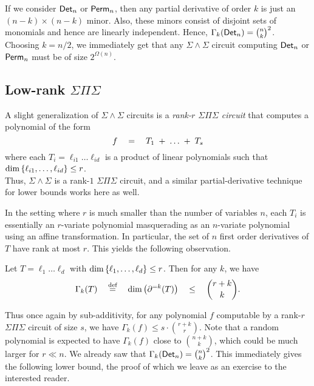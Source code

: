 \documentclass[12pt]{report}
\begin{document}
If we consider $\mathsf{Det}_n$ or $\mathsf{Perm}_n$, then any partial derivative of order $k$ is just an $(n-k)\times(n-k)$ minor. Also, these minors consist of disjoint sets of monomials and hence are linearly independent. Hence, $\Gamma_k(\mathsf{Det}_n) = \binom{n}{k}^2$. Choosing $k = n/2$, we immediately get that any $\Sigma\!\wedge\!\Sigma$ circuit computing $\mathsf{Det}_n$ or $\mathsf{Perm}_n$ must be of size $2^{\Omega(n)}$. \\

\subsection{Low-rank $\Sigma\Pi\Sigma$}\label{sec:low-rank-sps}

A slight generalization of $\Sigma\!\wedge\!\Sigma$ circuits is a \emph{rank-$r$ $\Sigma\Pi\Sigma$ circuit} that computes a polynomial of the form 
$$
f \quad = \quad  T_1 \;+\; \dots \;+\; T_s
$$
where each $T_i = \ell_{i1}\dots \ell_{id}$ is a product of linear polynomials such that $\dim\left\{\ell_{i1},\dots, \ell_{id}\right\}\leq r$. \\

Thus, $\Sigma\!\wedge\!\Sigma$  is a rank-$1$ $\Sigma\Pi\Sigma$ circuit, and a similar partial-derivative technique for lower bounds works here as well. 

In the setting where $r$ is much smaller than the number of variables $n$, each $T_i$ is essentially an $r$-variate polynomial masquerading as an $n$-variate polynomial using an affine transformation. In particular, the set of $n$ first order derivatives of $T$ have rank at most $r$. This yields the following observation.

\begin{observation}
Let $T = \ell_1\dots \ell_d$ with $\dim\left\{\ell_1,\dots, \ell_d\right\}\leq r$. Then for any $k$, we have
$$
\Gamma_k(T) \quad \stackrel{\text{def}}{=} \quad\dim\left(\partial^{=k}(T)\right) \quad \leq \quad \binom{r+k}{k}.
$$
\end{observation}

Thus once again by sub-additivity, for any polynomial $f$ computable by a rank-$r$ $\Sigma\Pi\Sigma$ circuit of size $s$, we have $\Gamma_k(f) \leq s\cdot \binom{r+k}{r}$. Note that a random polynomial is expected to have $\Gamma_k(f)$ close to $\binom{n+k}{k}$, which could be much larger for $r\ll n$. We already saw that $\Gamma_k(\mathsf{Det}_n) = \binom{n}{k}^2$. This immediately gives the following lower bound, the proof of which we leave as an exercise to the interested reader. 
\end{document}
